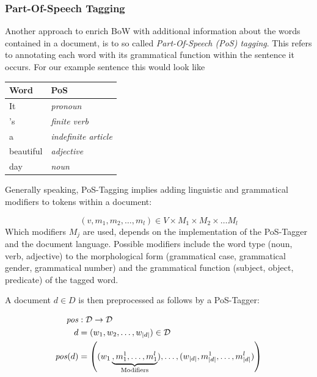 \subsubsection{Part-Of-Speech Tagging}
Another approach to enrich BoW with additional information about the words
contained in a document, is to so called \emph{Part-Of-Speech (PoS) tagging}.
This refers to annotating each word with its grammatical function within the sentence it occurs.
For our example sentence this would look like

\begin{center}
\begin{tabular}{|l|l|}
\hline
\textbf{Word} & \textbf{PoS} \\
\hline
It 		  & \emph{pronoun} \\
's 		  & \emph{finite verb} \\
a 		  & \emph{indefinite article}  \\
beautiful & \emph{adjective} \\
day		  & \emph{noun} \\
\hline
\end{tabular}
\end{center}

Generally speaking, PoS-Tagging implies adding linguistic and
grammatical modifiers to tokens within a document:

\begin{equation*}
(v,m_1,m_2,\ldots,m_l) \in
V \times M_1 \times M_2 \times \ldots M_l
\end{equation*}
Which modifiers $M_j$ are used, depends on the implementation of the
PoS-Tagger and the document language. Possible modifiers include the word
type (noun, verb, adjective) to the morphological form (grammatical case,
grammatical gender, grammatical number) and the grammatical function
(subject, object, predicate) of the tagged word.

A document $d \in D$ is then preprocessed as follows by a PoS-Tagger:

\begin{equation*}
\begin{split}
\mathit{pos} &:  \mathcal{D} \to \mathcal{D} \\
d &= (w_1,w_2,\ldots,w_{|d|}) \in \mathcal{D} \\
\mathit{pos}(d) &=  \left((w_1\underbrace{,
m_1^1, \ldots,m_1^l}_{\mathrm{Modifiers}}), \ldots,
(w_{|d|},m_{|d|}^1,\ldots,m_{|d|}^l)\right) \\
\end{split}
\end{equation*}

